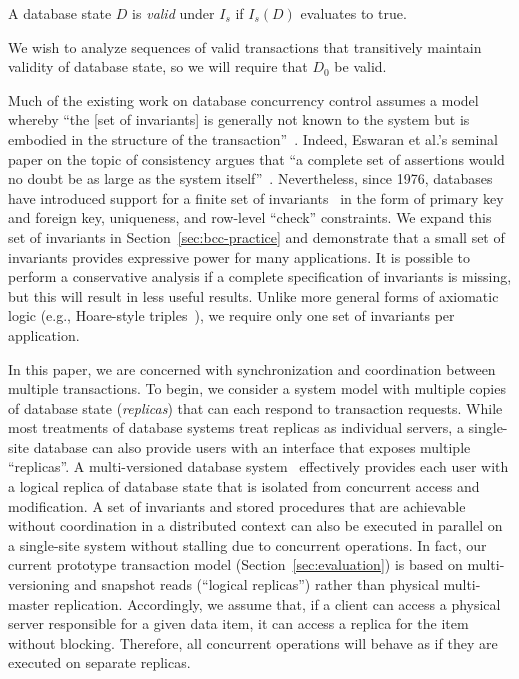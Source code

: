 \begin{definition}
A database state $D$ is \textit{valid} under $I_s$ if $I_s(D)$
evaluates to true.
\end{definition}

We wish to analyze sequences of valid transactions that transitively
maintain validity of database state, so we will require that $D_0$ be
valid. 

 Much of the existing work on
database concurrency control assumes a model whereby ``the [set of
  invariants] is generally not known to the system but is embodied in
the structure of the transaction''~\cite{traiger-tods}. Indeed,
Eswaran et al.'s seminal paper on the topic of consistency argues that
``a complete set of assertions would no doubt be as large as the
system itself''~\cite{eswaran-consistency}. Nevertheless, since 1976,
databases have introduced support for a finite set of
invariants~\cite{korth-serializability} in the form of primary key and
foreign key, uniqueness, and row-level ``check'' constraints. We
expand this set of invariants in Section~\ref{sec:bcc-practice} and
demonstrate that a small set of invariants provides expressive power
for many applications. It is possible to perform a conservative
analysis if a complete specification of invariants is missing, but
this will result in less useful results. Unlike more general forms of
axiomatic logic (e.g., Hoare-style triples~\cite{decomp-semantics}),
we require only one set of invariants per application.\vspace{.5em}

 In this paper, we are concerned with
synchronization and coordination between multiple transactions. To
begin, we consider a system model with multiple copies of database
state (\textit{replicas}) that can each respond to transaction
requests. While most treatments of database systems treat replicas as
individual servers, a single-site database can also provide users with
an interface that exposes multiple ``replicas''. A multi-versioned
database system~\cite{bernstein-book} effectively provides each user
with a logical replica of database state that is isolated from
concurrent access and modification. A set of invariants and stored
procedures that are achievable without coordination in a distributed
context can also be executed in parallel on a single-site system
without stalling due to concurrent operations.  In fact, our current
prototype transaction model (Section~\ref{sec:evaluation}) is based on
multi-versioning and snapshot reads (``logical replicas'') rather than
physical multi-master replication. Accordingly, we assume that, if a
client can access a physical server responsible for a given data item,
it can access a replica for the item without blocking. Therefore, all
concurrent operations will behave as if they are executed on separate
replicas.

